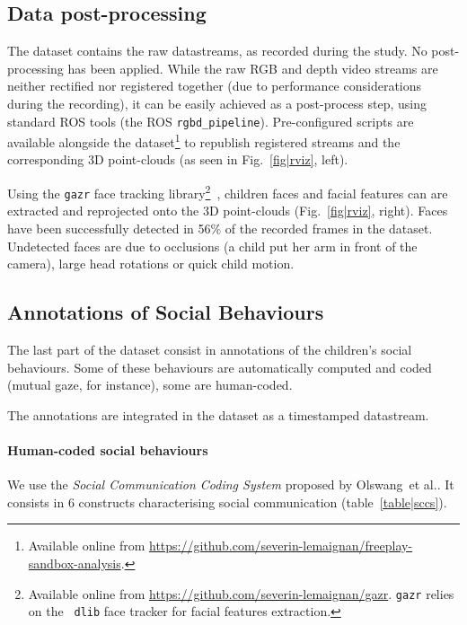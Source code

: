 \documentclass{article}
\newcommand{\etal}{et al.\xspace}
\begin{document}
\subsection{Data post-processing}
\label{postprocessing}

The dataset contains the raw datastreams, as recorded during the study. No post-processing has been applied.
While the raw RGB and depth video streams are neither rectified nor registered together (due
to performance considerations during the recording), it can be easily achieved
as a post-process step, using standard ROS tools (the ROS {\tt rgbd\_pipeline}).
Pre-configured scripts are available alongside the dataset\footnote{Available
online from
\url{https://github.com/severin-lemaignan/freeplay-sandbox-analysis}.} to
republish registered streams and the corresponding 3D point-clouds (as seen in
Fig.~\ref{fig|rviz}, left).

Using the {\tt gazr} face tracking library\footnote{Available online from
\url{https://github.com/severin-lemaignan/gazr}. {\tt gazr} relies on the {\tt
dlib} face tracker for facial features
extraction.}~\cite{lemaignan2016realtime}, children faces and facial features can
are extracted and reprojected onto the 3D point-clouds (Fig.~\ref{fig|rviz},
right). Faces have been successfully detected in 56\% of the recorded frames
in the dataset. Undetected faces are due to occlusions (a child put her arm in
front of the camera), large head rotations or quick child motion.

\subsection{Annotations of Social Behaviours}

The last part of the dataset consist in annotations of the
children's social behaviours. Some of these behaviours are automatically
computed and coded (mutual gaze, for instance), some are human-coded.

The annotations are integrated in the dataset as a timestamped datastream.

\paragraph{Human-coded social behaviours}

We use the \emph{Social Communication Coding System} proposed by
Olswang~\etal\cite{olswang2006reliability}. It consists in 6 constructs
characterising social communication (table~\ref{table|sccs}).
\end{document}
